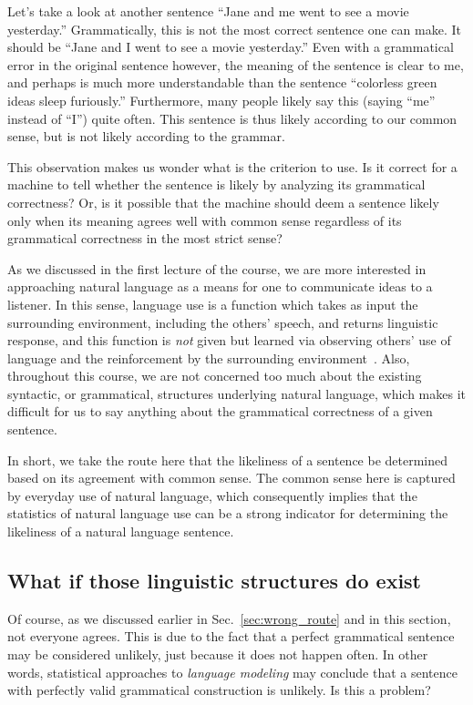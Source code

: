 \documentclass{report}
\begin{document}
Let's take a look at another sentence ``Jane and me went to see a movie
yesterday.'' Grammatically, this is not the most correct sentence one can make.
It should be ``Jane and I went to see a movie yesterday.'' Even with a
grammatical error in the original sentence however, the meaning of the sentence
is clear to me, and perhaps is much more understandable than the sentence
``colorless green ideas sleep furiously.'' Furthermore, many people likely say
this (saying ``me'' instead of ``I'') quite often. This sentence is thus likely
according to our common sense, but is not likely according to the grammar.

This observation makes us wonder what is the criterion to use. Is it correct for
a machine to tell whether the sentence is likely by analyzing its grammatical
correctness? Or, is it possible that the machine should deem a sentence likely
only when its meaning agrees well with common sense regardless of its
grammatical correctness in the most strict sense?

As we discussed in the first lecture of the course, we are more interested in
approaching natural language as a means for one to communicate ideas to a
listener. In this sense, language use is a function which takes as input the
surrounding environment, including the others' speech, and returns linguistic
response, and this function is {\em not} given but learned via observing others'
use of language and the reinforcement by the surrounding
environment~\cite{skinner2014verbal}. Also, throughout this course, we are not
concerned too much about the existing syntactic, or grammatical, structures
underlying natural language, which makes it difficult for us to say anything
about the grammatical correctness of a given sentence.

In short, we take the route here that the likeliness of a sentence be determined
based on its agreement with common sense. The common sense here is captured by
everyday use of natural language, which consequently implies that the statistics
of natural language use can be a strong indicator for determining the likeliness
of a natural language sentence. 

\subsection{What if those linguistic structures do exist}
\label{sec:linguistic_lm}

Of course, as we discussed earlier in Sec.~\ref{sec:wrong_route} and in this
section, not everyone agrees.  This is due to the fact that a perfect
grammatical sentence may be considered unlikely, just because it does not happen
often. In other words, statistical approaches to {\em language modeling} may
conclude that a sentence with perfectly valid grammatical construction is
unlikely. Is this a problem? 
\end{document}
